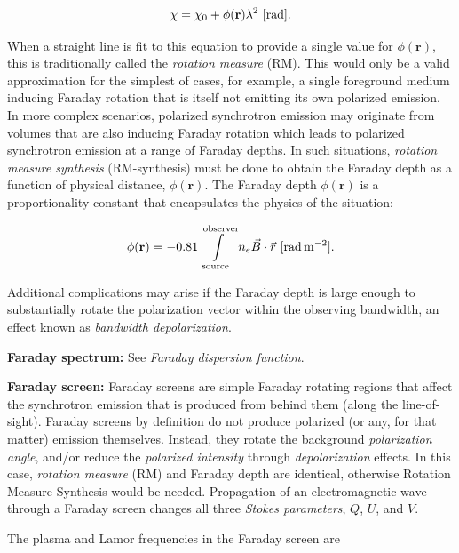 \documentclass[a4paper,10pt]{article}
\begin{document}
\begin{align*}
    \chi = \chi_0 + \phi(\mathbf{r}) \lambda^2 ~[{\rm rad}].
\end{align*}

{\noindent}When a straight line is fit to this equation to provide a single value for $\phi(\mathbf{r})$, this is traditionally called the \textit{rotation measure} (RM). This would only be a valid approximation for the simplest of cases, for example, a single foreground medium inducing Faraday rotation that is itself not emitting its own polarized emission. In more complex scenarios, polarized synchrotron emission may originate from volumes that are also inducing Faraday rotation which leads to polarized synchrotron emission at a range of Faraday depths. In such situations, \textit{rotation measure synthesis} (RM-synthesis) must be done to obtain the Faraday depth as a function of physical distance, $\phi(\mathbf{r})$. The Faraday depth $\phi(\mathbf{r})$ is a proportionality constant that encapsulates the physics of the situation:

\begin{align*}
    \phi(\mathbf{r}) = -0.81 \int\limits_\mathrm{source}^\mathrm{observer}n_e\vec{B}\cdot\vec{{\rm }r} ~ [{\rm rad\,m^{-2}}].
\end{align*}

{\noindent}Additional complications may arise if the Faraday depth is large enough to substantially rotate the polarization vector within the observing bandwidth, an effect known as \textit{bandwidth depolarization}.

{\noindent}\textbf{Faraday spectrum:} See \textit{Faraday dispersion function}.

{\noindent}\textbf{Faraday screen:} Faraday screens are simple Faraday rotating regions that affect the synchrotron emission that is produced from behind them (along the line-of-sight). Faraday screens by definition do not produce polarized (or any, for that matter) emission themselves. Instead, they rotate the background \textit{polarization angle}, and/or reduce the \textit{polarized intensity} through \textit{depolarization} effects. In this case, \textit{rotation measure} (RM) and Faraday depth are identical, otherwise Rotation Measure Synthesis would be needed. Propagation of an electromagnetic wave through a Faraday screen changes all three \textit{Stokes parameters}, $Q$, $U$, and $V$.

{\noindent}The plasma and Lamor frequencies in the Faraday screen are
\end{document}
